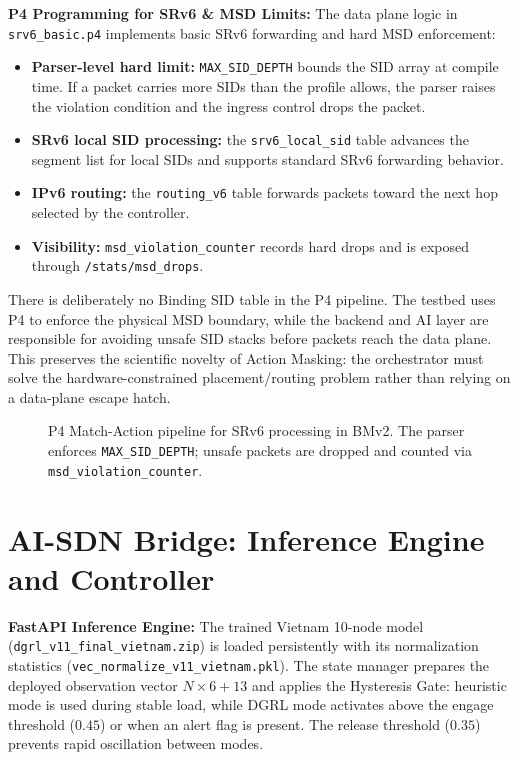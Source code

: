 \documentclass[12pt, a4paper, reqno, oneside]{book}
\begin{document}
\textbf{P4 Programming for SRv6 \& MSD Limits:} The data plane logic in \texttt{srv6\_basic.p4} \cite{stockmayer2020p4sfc} implements basic SRv6 forwarding and hard MSD enforcement:
\begin{itemize}
    \item \textbf{Parser-level hard limit:} \texttt{MAX\_SID\_DEPTH} bounds the SID array at compile time. If a packet carries more SIDs than the profile allows, the parser raises the violation condition and the ingress control drops the packet.
    \item \textbf{SRv6 local SID processing:} the \texttt{srv6\_local\_sid} table advances the segment list for local SIDs and supports standard SRv6 forwarding behavior.
    \item \textbf{IPv6 routing:} the \texttt{routing\_v6} table forwards packets toward the next hop selected by the controller.
    \item \textbf{Visibility:} \texttt{msd\_violation\_counter} records hard drops and is exposed through \texttt{/stats/msd\_drops}.
\end{itemize}

There is deliberately no Binding SID table in the P4 pipeline. The testbed uses P4 to enforce the physical MSD boundary, while the backend and AI layer are responsible for avoiding unsafe SID stacks before packets reach the data plane. This preserves the scientific novelty of Action Masking: the orchestrator must solve the hardware-constrained placement/routing problem rather than relying on a data-plane escape hatch.

\begin{figure}[H]
    \centering
    \vspace{6cm}
    \caption{P4 Match-Action pipeline for SRv6 processing in BMv2. The parser enforces \texttt{MAX\_SID\_DEPTH}; unsafe packets are dropped and counted via \texttt{msd\_violation\_counter}.}
    \label{fig:p4_pipeline}
\end{figure}

\section{AI-SDN Bridge: Inference Engine and Controller}
\textbf{FastAPI Inference Engine:} The trained Vietnam 10-node model (\texttt{dgrl\_v11\_final\_vietnam.zip}) is loaded persistently with its normalization statistics (\texttt{vec\_normalize\_v11\_vietnam.pkl}). The state manager prepares the deployed observation vector $N \times 6 + 13$ and applies the Hysteresis Gate: heuristic mode is used during stable load, while DGRL mode activates above the engage threshold ($0.45$) or when an alert flag is present. The release threshold ($0.35$) prevents rapid oscillation between modes.
\end{document}

